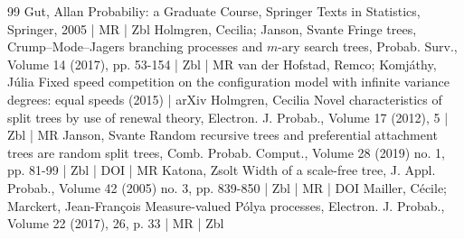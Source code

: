 \documentclass[10pt]{amsart}
\theoremstyle{definition}\newtheorem{defi}[theo]{Definition}\newtheorem{rema}[theo]{Remark}\newtheorem{exam}[theo]{Example}\newtheorem{exem}[theo]{Example}\newtheorem{nota}[theo]{Notation}
\begin{document}
\begin{thebibliography}{99}
 Gut, Allan Probabiliy: a Graduate Course, Springer Texts in Statistics, Springer, 2005 | MR | Zbl
 Holmgren, Cecilia; Janson, Svante Fringe trees, Crump–Mode–Jagers branching processes and $m$-ary search trees, Probab. Surv., Volume 14 (2017), pp. 53-154 | Zbl | MR
 van der Hofstad, Remco; Komjáthy, Júlia Fixed speed competition on the configuration model with infinite variance degrees: equal speeds (2015) | arXiv
 Holmgren, Cecilia Novel characteristics of split trees by use of renewal theory, Electron. J. Probab., Volume 17 (2012), 5 | Zbl | MR
 Janson, Svante Random recursive trees and preferential attachment trees are random split trees, Comb. Probab. Comput., Volume 28 (2019) no. 1, pp. 81-99 | Zbl | DOI | MR
 Katona, Zsolt Width of a scale-free tree, J. Appl. Probab., Volume 42 (2005) no. 3, pp. 839-850 | Zbl | MR | DOI
 Mailler, Cécile; Marckert, Jean-François Measure-valued Pólya processes, Electron. J. Probab., Volume 22 (2017), 26, p. 33 | MR | Zbl
\end{thebibliography}
\end{document}
